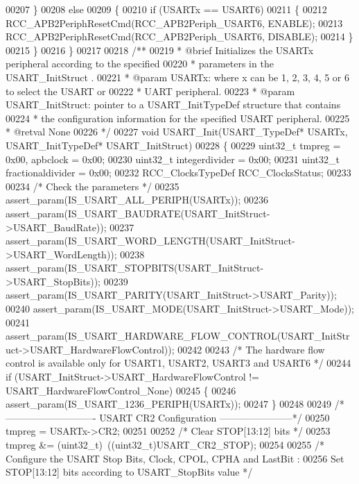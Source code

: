 \begin{DoxyCode}
00207   \}
00208   \textcolor{keywordflow}{else}
00209   \{
00210     \textcolor{keywordflow}{if} (USARTx == USART6)
00211     \{
00212       RCC_APB2PeriphResetCmd(RCC_APB2Periph_USART6, ENABLE);
00213       RCC_APB2PeriphResetCmd(RCC_APB2Periph_USART6, DISABLE);
00214     \}
00215   \}
00216 \}
00217 
00218 \textcolor{comment}{/**}
00219 \textcolor{comment}{  * @brief  Initializes the USARTx peripheral according to the specified}
00220 \textcolor{comment}{  *         parameters in the USART\_InitStruct .}
00221 \textcolor{comment}{  * @param  USARTx: where x can be 1, 2, 3, 4, 5 or 6 to select the USART or }
00222 \textcolor{comment}{  *         UART peripheral.}
00223 \textcolor{comment}{  * @param  USART\_InitStruct: pointer to a USART\_InitTypeDef structure that contains}
00224 \textcolor{comment}{  *         the configuration information for the specified USART peripheral.}
00225 \textcolor{comment}{  * @retval None}
00226 \textcolor{comment}{  */}
00227 \textcolor{keywordtype}{void} USART_Init(USART\_TypeDef* USARTx, USART\_InitTypeDef* USART\_InitStruct)
00228 \{
00229   uint32\_t tmpreg = 0x00, apbclock = 0x00;
00230   uint32\_t integerdivider = 0x00;
00231   uint32\_t fractionaldivider = 0x00;
00232   RCC\_ClocksTypeDef RCC\_ClocksStatus;
00233 
00234   \textcolor{comment}{/* Check the parameters */}
00235   assert_param(IS\_USART\_ALL\_PERIPH(USARTx));
00236   assert_param(IS\_USART\_BAUDRATE(USART\_InitStruct->USART\_BaudRate));
00237   assert_param(IS\_USART\_WORD\_LENGTH(USART\_InitStruct->USART\_WordLength));
00238   assert_param(IS\_USART\_STOPBITS(USART\_InitStruct->USART\_StopBits));
00239   assert_param(IS\_USART\_PARITY(USART\_InitStruct->USART\_Parity));
00240   assert_param(IS\_USART\_MODE(USART\_InitStruct->USART\_Mode));
00241   assert_param(IS\_USART\_HARDWARE\_FLOW\_CONTROL(USART\_InitStruct->USART\_HardwareFlowControl));
00242 
00243   \textcolor{comment}{/* The hardware flow control is available only for USART1, USART2, USART3 and USART6 */}
00244   \textcolor{keywordflow}{if} (USART\_InitStruct->USART_HardwareFlowControl != 
      USART_HardwareFlowControl_None)
00245   \{
00246     assert_param(IS\_USART\_1236\_PERIPH(USARTx));
00247   \}
00248 
00249 \textcolor{comment}{/*---------------------------- USART CR2 Configuration -----------------------*/}
00250   tmpreg = USARTx->CR2;
00251 
00252   \textcolor{comment}{/* Clear STOP[13:12] bits */}
00253   tmpreg &= (uint32\_t)~((uint32\_t)USART_CR2_STOP);
00254 
00255   \textcolor{comment}{/* Configure the USART Stop Bits, Clock, CPOL, CPHA and LastBit :}
00256 \textcolor{comment}{      Set STOP[13:12] bits according to USART\_StopBits value */}

\end{DoxyCode}
